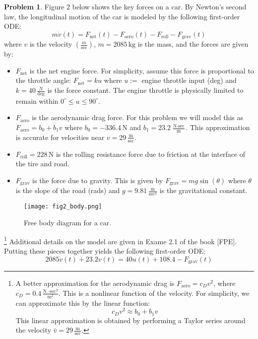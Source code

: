 \documentclass[12pt]{article}
\theoremstyle{definition}
\newtheorem{problem}{Problem}
\begin{document}
\begin{problem}
Figure 2 below shows the key forces on a car. By Newton’s second law, the longitudinal motion of the car is modeled by the following first-order ODE:
\begin{equation}
    m \dot{v}(t) = F_{\text{net}}(t) - F_{\text{aero}}(t) - F_{\text{roll}} - F_{\text{grav}}(t) \tag{5}
\end{equation}
where \( v \) is the velocity \(( \frac{m}{\text{sec}} )\), \( m = 2085 \, \text{kg} \) is the mass, and the forces are given by:
\begin{itemize}
    \item \( F_{\text{net}} \) is the net engine force. For simplicity, assume this force is proportional to the throttle angle: \( F_{\text{net}} = ku \) where \( u := \) engine throttle input (deg) and \( k = 40 \, \frac{N}{\text{deg}} \) is the force constant. The engine throttle is physically limited to remain within \( 0^\circ \leq u \leq 90^\circ \).
    \item \( F_{\text{aero}} \) is the aerodynamic drag force. For this problem we will model this as \( F_{\text{aero}} = b_0 + b_1 v \) where \( b_0 = -336.4 \, \text{N} \) and \( b_1 = 23.2 \, \frac{\text{N} \cdot \text{sec}}{\text{m}} \). This approximation is accurate for velocities near \( v = 29 \, \frac{\text{m}}{\text{sec}} \).
    \item \( F_{\text{roll}} = 228 \, \text{N} \) is the rolling resistance force due to friction at the interface of the tire and road.
    \item \( F_{\text{grav}} \) is the force due to gravity. This is given by \( F_{\text{grav}} = mg \sin(\theta) \) where \( \theta \) is the slope of the road (rads) and \( g = 9.81 \, \frac{\text{m}}{\text{sec}^2} \) is the gravitational constant.
\end{itemize}

\begin{figure}[h!]
    \centering
    \texttt{[image: fig2\_body.png]}
    \caption{Free body diagram for a car.}
\end{figure}


\footnote{
\noindent A better approximation for the aerodynamic drag is \( F_{\text{aero}} = c_D v^2 \), where \( c_D = 0.4 \, \frac{\text{N} \cdot \text{sec}^2}{\text{m}^2} \). This is a nonlinear function of the velocity. For simplicity, we can approximate this by the linear function:
\[
c_D v^2 \approx b_0 + b_1 v
\]
This linear approximation is obtained by performing a Taylor series around the velocity \( \bar{v} = 29 \, \frac{\text{m}}{\text{sec}} \).
}
Additional details on the model are given in Exame 2.1 of the book [FPE]. Putting these pieces together yields the following first-order ODE:
\begin{equation}
    2085 \dot{v}(t) + 23.2 v(t) = 40 u(t) + 108.4 - F_{\text{grav}}(t) \tag{6}
\end{equation}


\end{problem}
\end{document}
